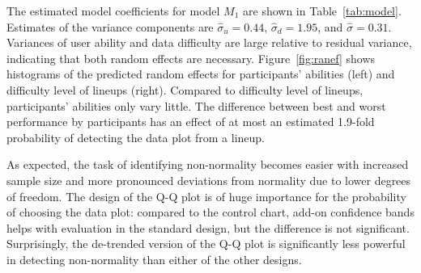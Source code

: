 \documentclass{article}\usepackage[]{graphicx}\usepackage[]{color}
\begin{document}
The estimated model coefficients for model $M_1$ are shown in Table~\ref{tab:model}. 
Estimates of the variance components are $\widehat{\sigma}_u = 0.44$, $\widehat{\sigma}_d=1.95$, and $\widehat{\sigma} = 0.31$. Variances of user ability and data difficulty are large relative to residual variance, indicating that both random effects are necessary.
%
Figure~\ref{fig:ranef} shows histograms of the predicted random effects for participants' abilities (left) and difficulty level of lineups (right). Compared to difficulty level of lineups, participants' abilities only vary little. The difference between best and worst performance by participants has an effect of at most an estimated 
1.9-fold probability of detecting the data plot from a lineup. 

%
As expected, the task of identifying non-normality becomes easier with increased sample size and more pronounced deviations from normality due to lower degrees of freedom. The  design of the Q-Q plot is of huge importance for the probability of choosing the data plot: compared to the control chart, add-on confidence bands helps with evaluation in the standard design, but the difference is not significant.  Surprisingly, the de-trended version of the Q-Q plot is significantly less powerful in detecting non-normality than either of the other designs. 
\end{document}
